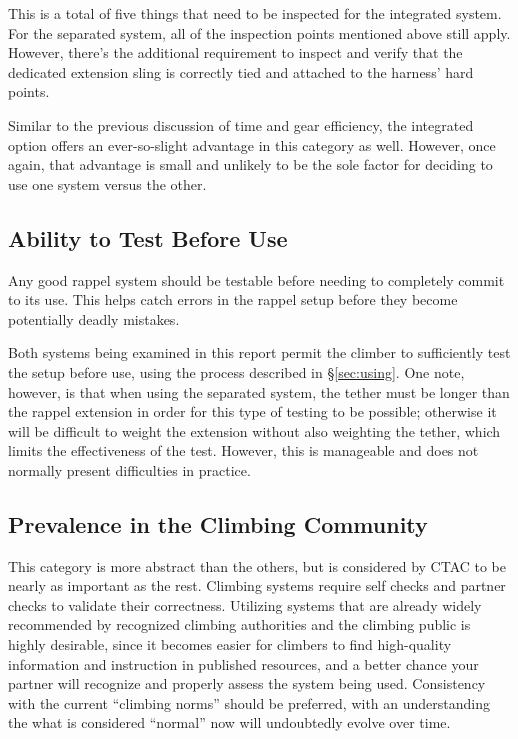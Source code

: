 \documentclass[nonacm,acmtog]{acmart}
\begin{document}
   This is a total of five things that need to be inspected for the integrated
   system.  For the separated system, all of the inspection points mentioned
   above still apply.  However, there's the additional requirement to inspect
   and verify that the dedicated extension sling is correctly tied and attached
   to the harness' hard points.

   Similar to the previous discussion of time and gear efficiency, the
   integrated option offers an ever-so-slight advantage in this category as
   well.  However, once again, that advantage is small and unlikely to be the
   sole factor for deciding to use one system versus the other.

\subsection{Ability to Test Before Use}
\label{sec:test}

   Any good rappel system should be testable before needing to completely
   commit to its use.  This helps catch errors in the rappel setup before they
   become potentially deadly mistakes.

   Both systems being examined in this report permit the climber to
   sufficiently test the setup before use, using the process described
   in \S\ref{sec:using}.  One note, however, is that when using the separated
   system, the tether must be longer than the rappel extension in order for
   this type of testing to be possible; otherwise it will be difficult to
   weight the extension without also weighting the tether, which limits the
   effectiveness of the test.  However, this is manageable and does not
   normally present difficulties in practice.

\subsection{Prevalence in the Climbing Community}
\label{sec:community}

   This category is more abstract than the others, but is considered by CTAC to
   be nearly as important as the rest.  Climbing systems require self checks
   and partner checks to validate their correctness.  Utilizing systems that
   are already widely recommended by recognized climbing authorities and the
   climbing public is highly desirable, since it becomes easier for climbers to
   find high-quality information and instruction in published resources, and a
   better chance your partner will recognize and properly assess the system
   being used.  Consistency with the current ``climbing norms'' should be
   preferred, with an understanding the what is considered ``normal'' now will
   undoubtedly evolve over time.
\end{document}
